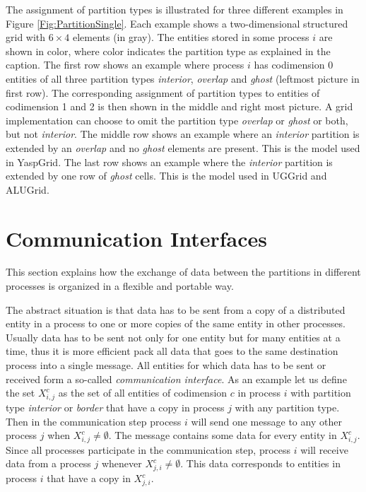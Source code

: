 \documentclass[11pt,a4paper,headinclude,footinclude,DIV16,normalheadings]{scrreprt}
\begin{document}
The assignment of partition types is illustrated for three different
examples in Figure \ref{Fig:PartitionSingle}. Each example shows a
two-dimensional structured grid with $6\times 4$ elements (in
gray). The entities stored in some process $i$ are shown in color,
where color indicates the partition type as explained in the
caption. The first row shows an example where process $i$ has
codimension 0 entities of all three partition types \textit{interior},
\textit{overlap} and \textit{ghost} (leftmost picture in first
row). The corresponding assignment of partition types to entities of
codimension 1 and 2 is then shown in the middle and right most
picture. A grid implementation can choose to omit the partition type
\textit{overlap}  or \textit{ghost} or both, but not
\textit{interior}. The middle row shows an example where an
\textit{interior} partition is extended by an \textit{overlap} and no
\textit{ghost} elements are present. This is the model used in
YaspGrid. The last row shows an example where the \textit{interior} partition
is extended by one row of  \textit{ghost} cells. This is the model
used in UGGrid and ALUGrid. 


\section{Communication Interfaces}

This section explains how the exchange of data between the partitions
in different processes is organized in a flexible and portable way.

The abstract situation is that data has to be sent from a copy of a
distributed entity in a process to one or more copies of the same
entity in other processes. Usually data has to be sent not only for
one entity but for many entities at a time, thus it is more efficient
pack all data that goes to the same destination process into a single
message. All entities for which data has to be sent or received form a
so-called \textit{communication interface}. As an example let us define the set
$X_{i,j}^c$ as the set of all entities of codimension $c$ in process $i$
  with partition type \textit{interior} or \textit{border} that have
a copy in process $j$ with any partition type. Then in the
communication step process $i$ will send one message to any other
process $j$ when $X_{i,j}^c\neq\emptyset$. The message contains some data for
every entity in  $X_{i,j}^c$. Since all processes participate in the
communication step, process $i$ will receive data from a process $j$
whenever $X_{j,i}^c\neq\emptyset$. This data corresponds to entities
in process $i$ that have a copy in $X_{j,i}^c$.
\end{document}
